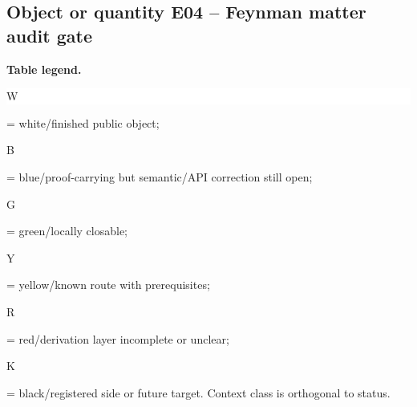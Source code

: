 \subsection*{Object or quantity E04 -- Feynman matter audit gate}
\hypertarget{objproof:E04}{}
\par\smallskip\noindent\begin{minipage}{0.99\linewidth}\footnotesize\raggedright\textbf{Table legend.} \colorbox{white}{\strut W} = white/finished public object; \colorbox{cyan!20}{\strut B} = blue/proof-carrying but semantic/API correction still open; \colorbox{green!18}{\strut G} = green/locally closable; \colorbox{yellow!25}{\strut Y} = yellow/known route with prerequisites; \colorbox{red!20}{\strut R} = red/derivation layer incomplete or unclear; \colorbox{black!18}{\strut K} = black/registered side or future target. Context class is orthogonal to status.\end{minipage}\par\vspace{0.25em}
